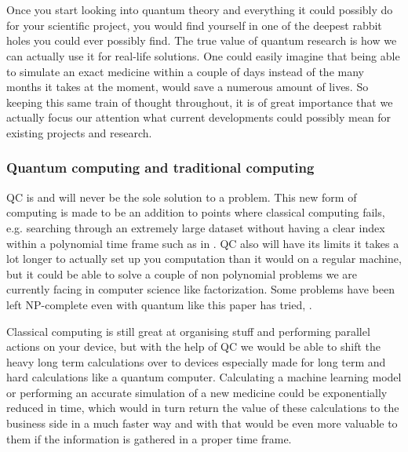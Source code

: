 
\chapter{}
\label{ch:computing-with-quantum}


Once you start looking into quantum theory and everything it could possibly do for your scientific project, you would find yourself in one of the deepest rabbit holes you could ever possibly find. The true value of quantum research is how we can actually use it for real-life solutions. One could easily imagine that being able to simulate an exact medicine within a couple of days instead of the many months it takes at the moment, would save a numerous amount of lives. So keeping this same train of thought throughout, it is of great importance that we actually focus our attention what current developments could possibly mean for existing projects and research.

\subsection{Quantum computing and traditional computing}

QC is and will never be the sole solution to a problem. This new form of computing is made to be an addition to points where classical computing fails, e.g. searching through an extremely large dataset without having a clear index within a polynomial time frame such as in \textcite{Terhal1998}. QC also will have its limits it takes a lot longer to actually set up you computation than it would on a regular machine, but it could be able to solve a couple of non polynomial problems we are currently facing in computer science like factorization. Some problems have been left NP-complete even with quantum like this paper has tried, \textcite{Wang2007}.

Classical computing is still great at organising stuff and performing parallel actions on your device, but with the help of QC we would be able to shift the heavy long term calculations over to devices especially made for long term and hard calculations like a quantum computer. Calculating a machine learning model \textcite{Schuld2014} or performing an accurate simulation of a new medicine could be exponentially reduced in time, which would in turn return the value of these calculations to the business side in a much faster way and with that would be even more valuable to them if the information is gathered in a proper time frame. \autocite{Schuld2015} \autocite{Troyer2005}

